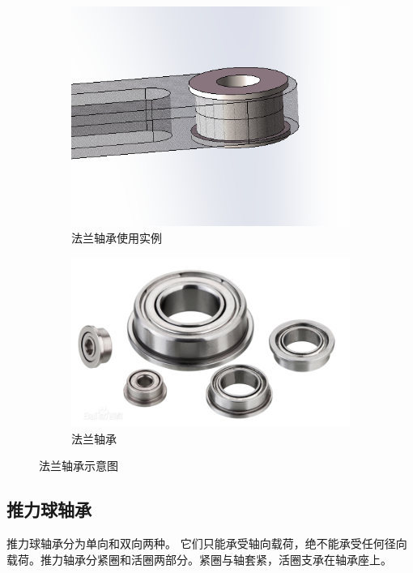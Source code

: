\documentclass[UTF8]{article} %
\begin{document}
\begin{figure}[H]
  \centering
  \begin{subfigure}[b]{0.4\textwidth}
         \centering
         \includegraphics[width=\textwidth]{zhou3.png}
          \caption{法兰轴承使用实例}
  \end{subfigure}
  \quad
  \begin{subfigure}[b]{0.4\textwidth}
          \centering
          \includegraphics[width=\textwidth]{zhou4.png}
          \caption{法兰轴承}
  \end{subfigure}
  \caption{法兰轴承示意图}
\end{figure}

\subsection{推力球轴承}
推力球轴承分为单向和双向两种。 它们只能承受轴向载荷，绝不能承受任何径向载荷。推力轴承分紧圈和活圈两部分。紧圈与轴套紧，活圈支承在轴承座上。
\end{document}
